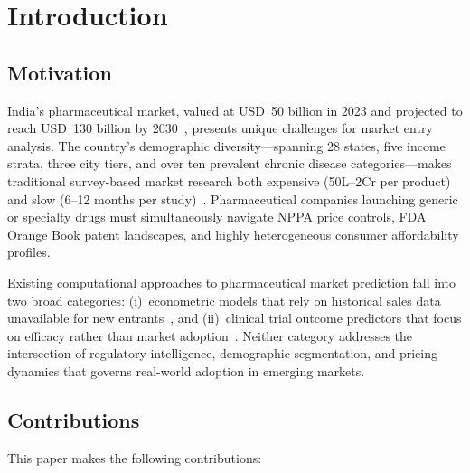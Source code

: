 \documentclass[10pt,journal,compsoc]{IEEEtran}
\begin{document}
\IEEEpeerreviewmaketitle

\section{Introduction}

\subsection{Motivation}

India's pharmaceutical market, valued at USD~50 billion in 2023 and projected to reach
USD~130 billion by 2030~\cite{ibef2023}, presents unique challenges for market entry
analysis.
The country's demographic diversity---spanning 28 states, five income strata, three
city tiers, and over ten prevalent chronic disease categories---makes traditional
survey-based market research both expensive (\rupee50L--\rupee2Cr per product) and
slow (6--12 months per study)~\cite{sharma2022}.
Pharmaceutical companies launching generic or specialty drugs must simultaneously
navigate NPPA price controls, FDA Orange Book patent landscapes, and highly
heterogeneous consumer affordability profiles.

Existing computational approaches to pharmaceutical market prediction fall into two
broad categories:
(i)~econometric models that rely on historical sales data unavailable for new
entrants~\cite{rao2021}, and
(ii)~clinical trial outcome predictors that focus on efficacy rather than market
adoption~\cite{gayvert2016}.
Neither category addresses the intersection of regulatory intelligence, demographic
segmentation, and pricing dynamics that governs real-world adoption in emerging markets.

\subsection{Contributions}

This paper makes the following contributions:
\end{document}
